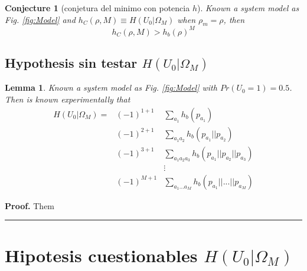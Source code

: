 \documentclass[a4paper,10pt]{article}
\newtheorem{mylemma}[mytheorem]{Lemma}
\newtheorem{conjecture}[mytheorem]{Conjecture}
\newenvironment{myproof}[1][Proof]{\textbf{#1.} }{\ \rule{0.5em}{0.5em}}
\begin{document}
\begin{mdframed}[style=MDFStyGrayScreen]
\begin{conjecture}[conjetura del minimo con potencia $h$]
 \label{lemm:h0OmegaM_3}
 Known a system model as Fig. \ref{fig:Model} and $h_{C}(\rho,M)\equiv H(U_0|\Omega_M)$ when $\rho_m=\rho$, then
\begin{equation}\label{eq:Hconjecture3}
h_{C}(\rho,M)  > h_{b}(\rho)^M
\end{equation}
\end{conjecture}
\end{mdframed}


\subsection{Hypothesis sin testar $H(U_0|\Omega_M)$}
\label{subsec:h0OmegaM}

\begin{mylemma}
 \label{lemm:1}
  Known a system model as Fig. \ref{fig:Model} with $Pr(U_0=1)=0.5$. Then is known 
experimentally that
\begin{equation}
 \begin{matrix}
 H(U_0|\Omega_M)= & (-1)^{1+1} & \sum \limits_{a_1}         h_{b}(p_{a_1}) \\
 ~                & (-1)^{2+1} & \sum \limits_{a_1 a_2}     h_{b}(p_{a_1}||p_{a_2}) \\ 
 ~                & (-1)^{3+1}  & \sum \limits_{a_1 a_2 a_3} h_{b}(p_{a_1}||p_{a_2}||p_{a_3}) \\ 
 ~                & ~ & \vdots \\
 ~                & (-1)^{M+1}  & \sum \limits_{a_1 ... a_M} h_{b}(p_{a_1}|| ... ||p_{a_M}) 
 \end{matrix}
\end{equation}

\end{mylemma}
\begin{myproof}
Them
\end{myproof}

\section{Hipotesis cuestionables $H(U_0|\Omega_M)$ }
\label{subsec:h0OmegaM_B2}
\end{document}
